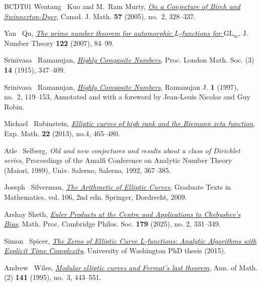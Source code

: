 \documentclass[12pt,reqno]{amsart}
\theoremstyle{definition}
\numberwithin{equation}{section}
\newcommand{\GL}{\mathrm{GL}}
\begin{document}
\begin{thebibliography}{BCDT01}
Wentang ~Kuo and M.~Ram Murty, \emph{\href{https://doi.org/10.4153/CJM-2005-014-0}{On a Conjecture of
  {B}irch and {S}winnerton-{D}yer}}, Canad. J. Math. \textbf{57} (2005), no.~2, 328--337.

Yan ~Qu,  \href{https://www.sciencedirect.com/science/article/pii/S0022314X06000709}{\emph{The prime number theorem for automorphic $L$-functions for $\GL_m$}}, J. Number Theory \textbf{122} (2007), 84--99. 


Srinivasa ~Ramanujan, \emph{\href{https://doi.org/10.1112/plms/s2_14.1.347}{Highly Composite
  Numbers}}, Proc. London Math. Soc. (3)
  \textbf{14} (1915), 347--409. 

Srinivasa ~Ramanujan, \emph{\href{https://doi.org/10.1023/A:1009764017495}{Highly Composite
  Numbers}}, Ramanujan J. \textbf{1} (1997),
  no.~2, 119--153, {A}nnotated and with a foreword by
  {J}ean-{L}ouis {N}icolas and {G}uy {R}obin. 

 Michael ~Rubinstein, \href{https://www.tandfonline.com/doi/abs/10.1080/10586458.2013.840870}{\emph{Elliptic curves of high rank and the Riemann zeta function}}, Exp. Math. \textbf{22} (2013), no.4,  465--480. 

Atle ~Selberg, \emph{Old and new conjectures and results about a class of Dirichlet series}, Proceedings of the Amalfi Conference on Analytic Number Theory (Maiori, 1989), Univ. Salerno, Salerno, 1992, 367--385. 

Joesph ~Silverman, \href{https://link.springer.com/book/10.1007/978-0-387-09494-6}{\emph{The Arithmetic of Elliptic Curves}}, Graduate Texts in Mathematics, vol. 106, 2nd edn. Springer, Dordrecht, 2009. 

Arshay Sheth, \href{https://www.cambridge.org/core/journals/mathematical-proceedings-of-the-cambridge-philosophical-society/article/euler-products-at-the-centre-and-applications-to-chebyshevs-bias/1DA1AFD9BE7EBCF9D5B49FE792E55E81}{\emph{Euler Products at the Centre and Applications to Chebyshev's Bias}}, Math. Proc. Cambridge Philos. Soc. \textbf{179} (2025), no. 2, 331–349. 

Simon ~Spicer, \href{https://www.sagemath.org/files/thesis/spicer-thesis-2015.pdf}{\emph{The Zeros of Elliptic Curve L-functions: Analytic Algorithms with Explicit Time Complexity}}, University of Washington PhD thesis (2015). 

Andrew ~Wiles, \href{https://www.jstor.org/stable/2118559?origin=crossref}{\emph{Modular elliptic curves and {F}ermat's last theorem}}, Ann. of
  Math. (2) \textbf{141} (1995), no.~3, 443--551.
  
\end{thebibliography}
\end{document}
